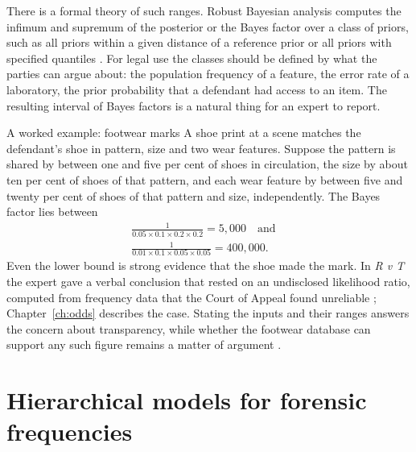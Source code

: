 There is a formal theory of such ranges. Robust Bayesian analysis computes the infimum and supremum of the posterior or the Bayes factor over a class of priors, such as all priors within a given distance of a reference prior or all priors with specified quantiles \citep{berger1994}. For legal use the classes should be defined by what the parties can argue about: the population frequency of a feature, the error rate of a laboratory, the prior probability that a defendant had access to an item. The resulting interval of Bayes factors is a natural thing for an expert to report.

\begin{casebox}{A worked example: footwear marks}
A shoe print at a scene matches the defendant's shoe in pattern, size and two wear features. Suppose the pattern is shared by between one and five per cent of shoes in circulation, the size by about ten per cent of shoes of that pattern, and each wear feature by between five and twenty per cent of shoes of that pattern and size, independently. The Bayes factor lies between
\begin{gather*}
\frac{1}{0.05\times 0.1 \times 0.2 \times 0.2} = 5{,}000 \quad\text{and}\quad\\ \frac{1}{0.01\times 0.1\times 0.05\times 0.05} = 400{,}000 .
\end{gather*}
Even the lower bound is strong evidence that the shoe made the mark. In \emph{R v T} the expert gave a verbal conclusion that rested on an undisclosed likelihood ratio, computed from frequency data that the Court of Appeal found unreliable \citep{rvt2010}; Chapter~\ref{ch:odds} describes the case. Stating the inputs and their ranges answers the concern about transparency, while whether the footwear database can support any such figure remains a matter of argument \citep{berger2011}.
\end{casebox}

\section{Hierarchical models for forensic frequencies}

